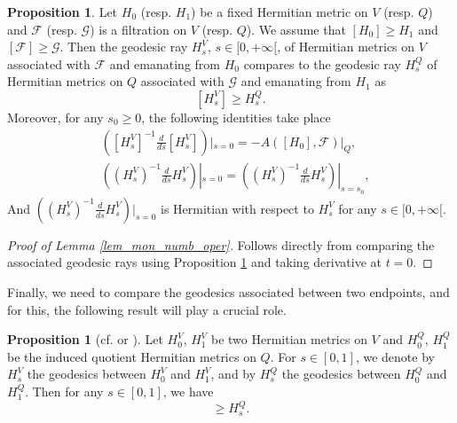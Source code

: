 \documentclass[12pt]{article}
\numberwithin{equation}{section}
\theoremstyle{theorem}
\theoremstyle{definition}
\newtheorem{prop}[thm]{Proposition}
\theoremstyle{remark}
\begin{document}
	\begin{prop}\label{prop_interpol}
		Let $H_0$ (resp. $H_1$) be a fixed Hermitian metric on $V$ (resp. $Q$) and $\mathcal{F}$ (resp. $\mathcal{G}$) is a filtration on $V$ (resp. $Q$).
		We assume that $[H_0] \geq H_1$ and $[\mathcal{F}] \geq \mathcal{G}$.
		Then the geodesic ray $H_s^V$, $s \in [0, +\infty[$, of Hermitian metrics on $V$ associated with $\mathcal{F}$ and emanating from $H_0$ compares to the geodesic ray $H_s^Q$ of Hermitian metrics on $Q$ associated with $\mathcal{G}$ and emanating from $H_1$ as
		\begin{equation}\label{eq_interpol}
			[H_s^V]
			\geq
			H_s^Q.
		\end{equation}
		Moreover, for any $s_0 \geq 0$, the following identities take place
		\begin{equation}
			\begin{aligned}
			&
			([H_s^V]^{-1} \frac{d}{ds} [H_s^V])|_{s = 0}
			=
			- A([H_0], \mathcal{F})|_Q, 
			\\
			& 
			((H_s^V)^{-1} \frac{d}{ds} H_s^V)|_{s = 0} = ((H_s^V)^{-1} \frac{d}{ds} H_s^V)|_{s = s_0}, 
			\end{aligned}
		\end{equation}
		And $((H_s^V)^{-1} \frac{d}{ds} H_s^V)|_{s = 0}$ is Hermitian with respect to $H_s^V$ for any $s \in [0, +\infty[$. 
	\end{prop}
	\begin{proof}[Proof of Lemma \ref{lem_mon_numb_oper}]
		Follows directly from comparing the associated geodesic rays using Proposition \ref{prop_interpol} and taking derivative at $t = 0$. 
	\end{proof}
	\par 
	Finally, we need to compare the geodesics associated between two endpoints, and for this, the following result will play a crucial role.
	\begin{prop}[{cf. \cite[Theorem 5.4.1]{InterpSp} or \cite[Corollary 4.22]{FinSecRing}}]\label{prop_interp2}
		Let $H^V_0$, $H^V_1$ be two Hermitian metrics on $V$ and $H^Q_0$, $H^Q_1$ be the induced quotient Hermitian metrics on $Q$.
		For $s \in [0, 1]$, we denote by $H^V_s$ the geodesics between $H^V_0$ and $H^V_1$, and by $H^Q_s$ the geodesics between $H^Q_0$ and $H^Q_1$.
		Then for any $s \in [0, 1]$, we have
		\begin{equation}
			[H^V_s]
			\geq
			H^Q_s.
		\end{equation}
	\end{prop}
\end{document}

